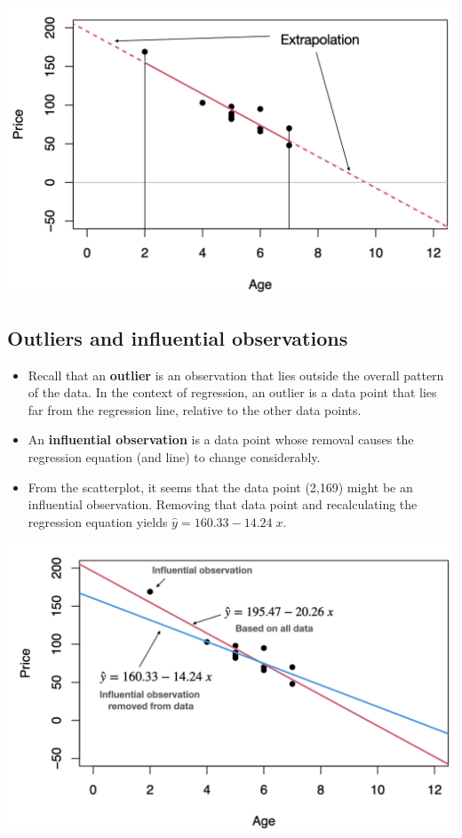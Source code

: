 \documentclass[
]{article}
\begin{document}
\begin{center}\includegraphics[width=0.6\linewidth,height=0.6\textheight]{figures/extrap} \end{center}

\hypertarget{outliers-and-influential-observations-1}{%
\subsection{Outliers and influential
observations}\label{outliers-and-influential-observations-1}}

\begin{itemize}
\item
  Recall that an \textbf{outlier} is an observation that lies outside
  the overall pattern of the data. In the context of regression, an
  outlier is a data point that lies far from the regression line,
  relative to the other data points.
\item
  An \textbf{influential observation} is a data point whose removal
  causes the regression equation (and line) to change considerably.
\item
  From the scatterplot, it seems that the data point (2,169) might be an
  influential observation. Removing that data point and recalculating
  the regression equation yields \(\hat{y}=160.33-14.24\;x\).
\end{itemize}

\begin{center}\includegraphics[width=0.6\linewidth,height=0.6\textheight]{figures/outliersreg} \end{center}
\end{document}
